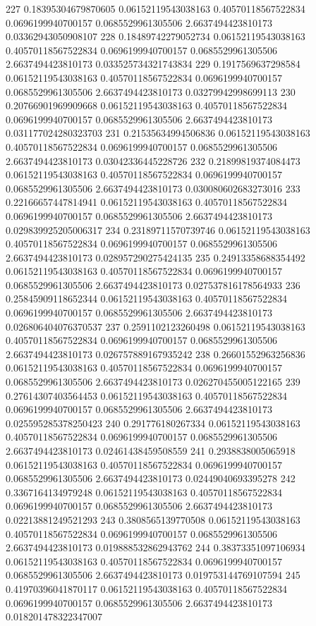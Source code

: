 {227 0.18395304679870605 0.06152119543038163 0.40570118567522834 0.0696199940700157 0.0685529961305506 2.6637494423810173 0.03362943050908107
228 0.18489742279052734 0.06152119543038163 0.40570118567522834 0.0696199940700157 0.0685529961305506 2.6637494423810173 0.033525734321743834
229 0.1917569637298584 0.06152119543038163 0.40570118567522834 0.0696199940700157 0.0685529961305506 2.6637494423810173 0.03279942998699113
230 0.20766901969909668 0.06152119543038163 0.40570118567522834 0.0696199940700157 0.0685529961305506 2.6637494423810173 0.031177024280323703
231 0.21535634994506836 0.06152119543038163 0.40570118567522834 0.0696199940700157 0.0685529961305506 2.6637494423810173 0.03042336445228726
232 0.21899819374084473 0.06152119543038163 0.40570118567522834 0.0696199940700157 0.0685529961305506 2.6637494423810173 0.030080602683273016
233 0.22166657447814941 0.06152119543038163 0.40570118567522834 0.0696199940700157 0.0685529961305506 2.6637494423810173 0.029839925205006317
234 0.23189711570739746 0.06152119543038163 0.40570118567522834 0.0696199940700157 0.0685529961305506 2.6637494423810173 0.028957290275424135
235 0.24913358688354492 0.06152119543038163 0.40570118567522834 0.0696199940700157 0.0685529961305506 2.6637494423810173 0.027537816178564933
236 0.25845909118652344 0.06152119543038163 0.40570118567522834 0.0696199940700157 0.0685529961305506 2.6637494423810173 0.026806404076370537
237 0.2591102123260498 0.06152119543038163 0.40570118567522834 0.0696199940700157 0.0685529961305506 2.6637494423810173 0.026757889167935242
238 0.26601552963256836 0.06152119543038163 0.40570118567522834 0.0696199940700157 0.0685529961305506 2.6637494423810173 0.026270455005122165
239 0.27614307403564453 0.06152119543038163 0.40570118567522834 0.0696199940700157 0.0685529961305506 2.6637494423810173 0.025595285378250423
240 0.291776180267334 0.06152119543038163 0.40570118567522834 0.0696199940700157 0.0685529961305506 2.6637494423810173 0.02461438459508559
241 0.2938838005065918 0.06152119543038163 0.40570118567522834 0.0696199940700157 0.0685529961305506 2.6637494423810173 0.02449040693395278
242 0.3367164134979248 0.06152119543038163 0.40570118567522834 0.0696199940700157 0.0685529961305506 2.6637494423810173 0.02213881249521293
243 0.3808565139770508 0.06152119543038163 0.40570118567522834 0.0696199940700157 0.0685529961305506 2.6637494423810173 0.019888532862943762
244 0.38373351097106934 0.06152119543038163 0.40570118567522834 0.0696199940700157 0.0685529961305506 2.6637494423810173 0.019753144769107594
245 0.41970396041870117 0.06152119543038163 0.40570118567522834 0.0696199940700157 0.0685529961305506 2.6637494423810173 0.018201478322347007
}
